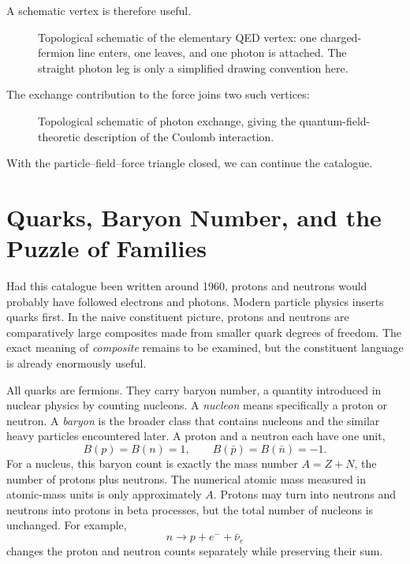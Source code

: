 A schematic vertex is therefore useful.

\begin{figure}[h]
\centering
{}
\caption{Topological schematic of the elementary QED vertex: one charged-fermion line enters, one leaves, and one photon is attached. The straight photon leg is only a simplified drawing convention here.}
\end{figure}

The exchange contribution to the force joins two such vertices:

\begin{figure}[h]
\centering
{}
\caption{Topological schematic of photon exchange, giving the quantum-field-theoretic description of the Coulomb interaction.}
\end{figure}

With the particle--field--force triangle closed, we can continue the catalogue.

\section{Quarks, Baryon Number, and the Puzzle of Families}

Had this catalogue been written around 1960, protons and neutrons would probably have followed electrons and photons. Modern particle physics inserts quarks first. In the naive constituent picture, protons and neutrons are comparatively large composites made from smaller quark degrees of freedom. The exact meaning of \emph{composite} remains to be examined, but the constituent language is already enormously useful.

All quarks are fermions. They carry baryon number, a quantity introduced in nuclear physics by counting nucleons. A \emph{nucleon} means specifically a proton or neutron. A \emph{baryon} is the broader class that contains nucleons and the similar heavy particles encountered later. A proton and a neutron each have one unit,
\begin{equation}
B(p)=B(n)=1,
\qquad
B(\bar p)=B(\bar n)=-1.
\end{equation}
For a nucleus, this baryon count is exactly the mass number \(A=Z+N\), the number of protons plus neutrons. The numerical atomic mass measured in atomic-mass units is only approximately \(A\). Protons may turn into neutrons and neutrons into protons in beta processes, but the total number of nucleons is unchanged. For example,
\begin{equation}
n\longrightarrow p+e^-+\bar\nu_e
\end{equation}
changes the proton and neutron counts separately while preserving their sum.

